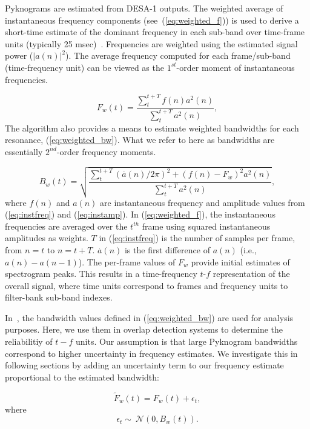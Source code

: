 {Pyknograms are estimated from DESA-1 outputs. The weighted average of instantaneous frequency components (see~(\ref{eq:weighted_f})) is used to derive a short-time estimate of the dominant frequency in each sub-band over time-frame units (typically 25 msec)~\cite{cohenlee90}. 
Frequencies are weighted using the estimated signal power ($|a(n)|^2$). 
The average frequency computed for each frame/sub-band (time-frequency unit) can be viewed as the $1^{st}$-order moment of instantaneous frequencies.  


\begin{equation}
\label{eq:weighted_f}
F_w(t) = \frac{\sum_{t}^{t+T}f(n)a^2(n)}{\sum_{t}^{t+T}a^2(n)},
\end{equation}
The algorithm also provides a means to estimate weighted bandwidths for each resonance, (\ref{eq:weighted_bw}). 
What we refer to here as bandwidths are essentially $2^{nd}$-order frequency moments. 

\begin{equation}
\label{eq:weighted_bw}
B_w(t) = \sqrt{\frac{\sum_{t}^{t+T}(\overset{\boldsymbol .}{a}(n) /2\pi)^2+(f(n)-F_w)^2a^2(n)}{\sum_{t}^{t+T}a^2(n)}},
\end{equation}
where $f(n)$ and $a(n)$ are instantaneous frequency and amplitude values from (\ref{eq:instfreq}) and (\ref{eq:instamp}). 
In (\ref{eq:weighted_f}), the instantaneous frequencies are averaged over the $t^{th}$ frame using squared instantaneous amplitudes as weights. 
$T$ in (\ref{eq:instfreq}) is the number of samples per frame, from $n = t$ to $n = t+T$. 
$\overset{\boldsymbol .}{a}(n)$ is the first difference of $a(n)$ (i.e., $a(n) - a(n-1)$). 
The per-frame values of $F_w$ provide initial estimates of spectrogram peaks. 
This results in a time-frequency {$t$-$f$} representation of the overall signal, where time units correspond to frames and frequency units to filter-bank sub-band indexes. 


In~\cite{potamianos_maragos_jasa96}, the bandwidth values defined in (\ref{eq:weighted_bw}) are used for analysis purposes. 
Here, we use them in overlap detection systems to determine the reliabilitiy of $t-f$ units. 
Our assumption is that large Pyknogram bandwidths correspond to higher uncertainty in frequency estimates. 
We investigate this in following sections by adding an uncertainty term to our frequency estimate proportional to the estimated bandwidth:



\begin{equation}
\label{eq:jitter_f}
\tilde F_w(t) = F_w(t) + \epsilon_t,
\end{equation}
where
\begin{equation}
\label{eq:jitter_pdf}
\epsilon_t \sim\ \mathcal{N}(0,B_w(t)).
\end{equation}

}
